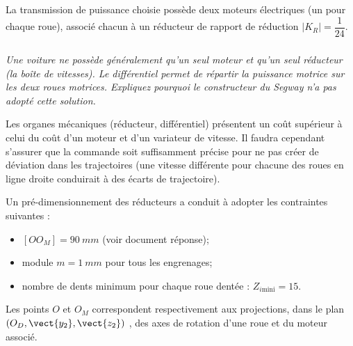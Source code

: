 \documentclass[10pt,fleqn]{article} %
\begin{document}
La transmission de puissance choisie possède deux moteurs électriques (un pour chaque roue), associé chacun à un réducteur de rapport de réduction  $|K_R| =\dfrac{1}{24}$.
\fi

\subparagraph{\label{q_09}}\textit{Une voiture ne possède généralement qu’un seul moteur et qu’un seul réducteur (la boîte de vitesses). Le différentiel permet de répartir la puissance motrice sur les deux roues motrices. Expliquez pourquoi le constructeur du Segway n’a pas adopté cette solution.}
\ifprof
\begin{corrige}
Les organes mécaniques (réducteur, différentiel) présentent un coût supérieur à celui du coût d'un moteur et d'un variateur de vitesse. Il faudra cependant s'assurer que la commande soit suffisamment précise pour ne pas créer de déviation dans les trajectoires (une vitesse différente pour chacune des roues en ligne droite conduirait à des écarts de trajectoire).
\end{corrige}
\else
\fi

\ifprof
\else

Un pré-dimensionnement des réducteurs a conduit à adopter les contraintes suivantes :
\begin{itemize}
\item $[OO_M]=\SI{90}{mm}$ (voir document réponse);
\item module $m=\SI{1}{mm}$  pour tous les engrenages;
\item nombre de dents minimum pour chaque roue dentée : $Z_{i \text{mini}}=15$. 
\end{itemize}

Les points $O$ et $O_M$ correspondent respectivement aux projections, dans le plan $\left( O_D,\vect{y_2},\vect{z_2}\right)$ , des axes de rotation d’une roue et du moteur associé.
\fi
\end{document}
